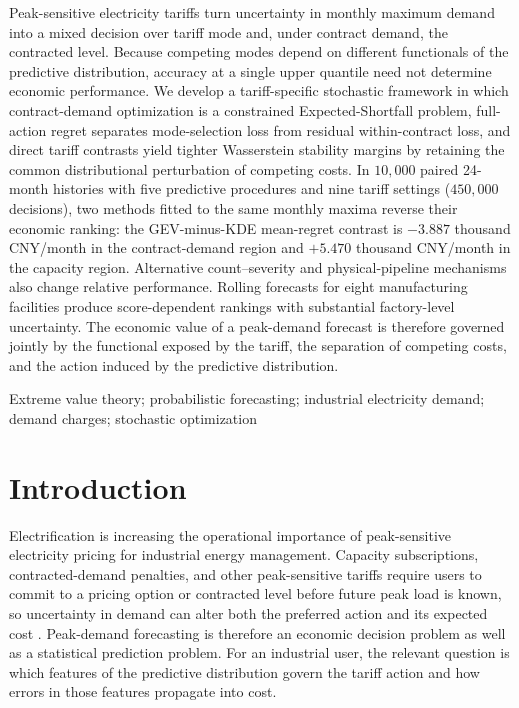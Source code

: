 \documentclass[Times1COL]{WileyNJDv5}
\begin{document}
{\fontsize{12}{16}\selectfont\noindent
Peak-sensitive electricity tariffs turn uncertainty in monthly maximum
demand into a mixed decision over tariff mode and, under contract
demand, the contracted level. Because competing modes depend on
different functionals of the predictive distribution, accuracy at a
single upper quantile need not determine economic performance. We
develop a tariff-specific stochastic framework in which
contract-demand optimization is a constrained Expected-Shortfall
problem, full-action regret separates mode-selection loss from residual
within-contract loss, and direct tariff contrasts yield tighter
Wasserstein stability margins by retaining the common distributional
perturbation of competing costs. In $10{,}000$ paired 24-month
histories with five predictive procedures and nine tariff settings
($450{,}000$ decisions), two methods fitted to the same monthly maxima
reverse their economic ranking: the GEV-minus-KDE mean-regret contrast
is $-3.887$ thousand CNY/month in the contract-demand region and
$+5.470$ thousand CNY/month in the capacity region. Alternative
count--severity and physical-pipeline mechanisms also change relative
performance. Rolling forecasts for eight manufacturing facilities
produce score-dependent rankings with substantial factory-level
uncertainty. The economic value of a peak-demand forecast is therefore
governed jointly by the functional exposed by the tariff, the
separation of competing costs, and the action induced by the predictive
distribution.\par}
\vspace{10pt}
\par\smallskip
{\fontsize{12}{16}\selectfont Extreme value theory; probabilistic forecasting; industrial electricity demand; demand charges; stochastic optimization\par}
\vspace{15pt}
\linenumbers
\fontsize{12}{16}\selectfont

\section{Introduction}
\label{sec:introduction}

Electrification is increasing the operational importance of
peak-sensitive electricity pricing for industrial energy management.
Capacity subscriptions, contracted-demand penalties, and other
peak-sensitive tariffs require users to commit to a pricing option or
contracted level before future peak load is known, so uncertainty in
demand can alter both the preferred action and its expected cost
\cite{BjarghovEtAl2022,WuEtAl2022,LimaEtAl2026,SungKwon2026}.
Peak-demand forecasting is therefore an economic decision problem as
well as a statistical prediction problem. For an industrial user, the
relevant question is which features of the predictive distribution
govern the tariff action and how errors in those features propagate
into cost.
\end{document}
